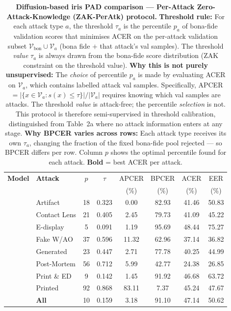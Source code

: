 \documentclass{article}
\begin{document}
\begin{table}[!htbp]
\centering
\scriptsize
\setlength{\tabcolsep}{4pt}
\caption{%
  \textbf{Diffusion-based iris PAD comparison — Per-Attack Zero-Attack-Knowledge
  (ZAK-PerAtk) protocol.}
  \textbf{Threshold rule:}
  For each attack type $a$, the threshold $\tau_a$ is the percentile $p_a$
  of bona-fide validation scores that minimises ACER on the per-attack
  validation subset $\mathcal{V}_{\mathrm{bon}} \cup \mathcal{V}_a$
  (bona fide $+$ that attack's val samples).
  The threshold \emph{value} $\tau_a$ is always drawn from the bona-fide
  score distribution (ZAK constraint on the threshold value).
  \textbf{Why this is not purely unsupervised:}
  The \emph{choice} of percentile $p_a$ is made by evaluating ACER on
  $\mathcal{V}_a$, which contains labelled attack val samples.
  Specifically, APCER $= |\{x \in \mathcal{V}_a : s(x) \le \tau\}|/|\mathcal{V}_a|$
  requires knowing which val samples are attacks.
  The threshold \emph{value} is attack-free; the percentile \emph{selection}
  is not.
  This protocol is therefore semi-supervised in threshold calibration,
  distinguished from Table~2a where no attack information enters at any stage.
  \textbf{Why BPCER varies across rows:}
  Each attack type receives its own $\tau_a$, changing the fraction of the
  fixed bona-fide pool rejected — so BPCER differs per row.
  Column $p$ shows the optimal percentile found for each attack.
  \textbf{Bold} = best ACER per attack.}
\label{tab:zak_perattack}

\begin{tabular}{l l c c c c c c}
\toprule
\textbf{Model} & \textbf{Attack} & $p$ & $\tau$ & APCER & BPCER & ACER & EER \\
               &                 &     &        & (\%)  & (\%)  & (\%) & (\%) \\
\midrule

& Artifact          & 18 & 0.323 &   0.00 & 82.93 &          41.46 &          50.83 \\
& Contact Lens      & 21 & 0.405 &   2.45 & 79.73 &          41.09 &          45.22 \\
& E-display         &  5 & 0.091 &   1.19 & 95.69 &          48.44 &          75.27 \\
& Fake W/AO         & 37 & 0.596 &  11.32 & 62.96 &          37.14 &          36.82 \\
& Generated         & 23 & 0.447 &   2.71 & 77.78 &          40.25 &          44.99 \\
& Post-Mortem       & 56 & 0.712 &   5.99 & 42.77 &          24.38 &          26.85 \\
& Print \& ED       &  9 & 0.142 &   1.45 & 91.92 &          46.68 &          63.72 \\
& Printed           & 92 & 0.868 &  83.11 &  7.37 &          45.24 &          47.67 \\
\cmidrule(lr){2-8}
& \textbf{All}      & 10 & 0.159 &   3.18 & 91.10 &          47.14 &          50.62 \\
\midrule


\end{tabular}
\end{table}
\end{document}
